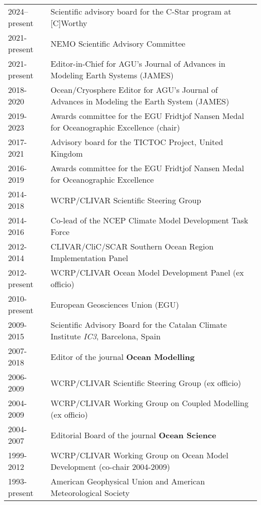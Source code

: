 \documentclass{article}
\begin{document}
\begin{tabular}{ll}
    2024--present & Scientific advisory board for the C-Star program at [C]Worthy
  \\
2021-present & NEMO Scientific Advisory Committee
\\

2021-present & Editor-in-Chief for  AGU's  Journal of Advances in Modeling Earth Systems (JAMES) 
 \\
2018-2020 & Ocean/Cryosphere Editor for AGU's  
Journal of Advances in Modeling the Earth System (JAMES) 
\\
2019-2023 & Awards committee for the EGU Fridtjof Nansen Medal for Oceanographic Excellence (chair) 
\\
2017-2021 & Advisory board for the TICTOC Project, United Kingdom
\\
  2016-2019 & Awards committee for the EGU Fridtjof Nansen Medal for Oceanographic Excellence 
  \\
2014-2018 &  WCRP/CLIVAR Scientific Steering Group 
\\
2014-2016     & Co-lead of the NCEP Climate Model Development Task Force
\\
2012-2014     & CLIVAR/CliC/SCAR Southern Ocean Region Implementation Panel 
\\
2012-present &  WCRP/CLIVAR Ocean Model Development Panel (ex officio)
\\
2010-present & European Geosciences Union (EGU)
\\
2009-2015  &  Scientific Advisory Board for the Catalan  Climate Institute {\it IC3}, Barcelona, Spain 
\\
2007-2018 & Editor of the journal {\bf Ocean Modelling} 
\\
2006-2009     &  WCRP/CLIVAR Scientific Steering Group (ex officio) 
\\
2004-2009     &  WCRP/CLIVAR Working Group on Coupled Modelling (ex officio) \\

2004-2007     & Editorial Board of the journal {\bf Ocean Science} \\

1999-2012     & WCRP/CLIVAR Working Group on Ocean Model Development  (co-chair 2004-2009) \\

1993-present  & American Geophysical Union and American Meteorological Society \\

\end{tabular}
\end{document}
